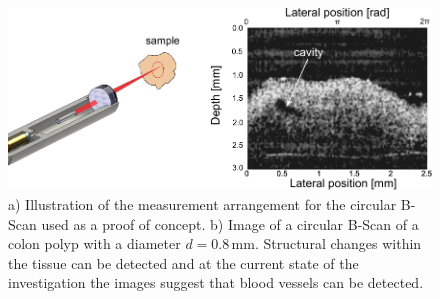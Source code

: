 \begin{figure}[h!]\centering \includegraphics{figures/50_Measurements/oct/Measurement_arrangement.pdf}
      \caption{a) Illustration of the measurement arrangement for the circular B-Scan used as a proof of concept. b) Image of a circular B-Scan of a colon polyp with a diameter $d=0.8\,\text{mm}$. Structural changes within the tissue can be detected and at the current state of the investigation the images suggest that blood vessels can be detected.}
      \label{fig:B-Scan}
\end{figure}
